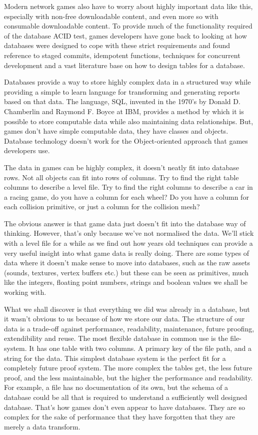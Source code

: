 Modern network games also have to worry about highly important data like this,
especially with non-free downloadable content, and even more so with consumable
downloadable content. To provide much of the functionality required of the
database ACID test, games developers have gone back to looking at how databases
were designed to cope with these strict requirements and found reference to
staged commits, idempotent functions, techniques for concurrent development and
a vast literature base on how to design tables for a database.

Databases provide a way to store highly complex data in a structured way while
providing a simple to learn language for transforming and generating reports
based on that data. The language, SQL, invented in the 1970's by Donald D.
Chamberlin and Raymond F. Boyce at IBM, provides a method by which it is
possible to store computable data while also maintaining data relationships.
But, games don't have simple computable data, they have classes and objects.
Database technology doesn't work for the Object-oriented approach that games
developers use.

The data in games can be highly complex, it doesn't neatly fit into database
rows. Not all objects can fit into rows of columns. Try to find the right table
columns to describe a level file. Try to find the right columns to describe a
car in a racing game, do you have a column for each wheel? Do you have a column
for each collision primitive, or just a column for the collision mesh?

The obvious answer is that game data just doesn't fit into the database way of
thinking. However, that's only because we've not normalised the data. We'll
stick with a level file for a while as we find out how years old techniques can
provide a very useful insight into what game data is really doing. There are
some types of data where it doesn't make sense to move into databases, such as
the raw assets (sounds, textures, vertex buffers etc.) but these can be seen as
primitives, much like the integers, floating point numbers, strings and boolean
values we shall be working with.

What we shall discover is that everything we did was already in a database, but
it wasn't obvious to us because of how we store our data. The structure of our
data is a trade-off against performance, readability, maintenance, future
proofing, extendibility and reuse. The most flexible database in common use is
the file-system. It has one table with two columns. A primary key of the file
path, and a string for the data. This simplest database system is the perfect
fit for a completely future proof system. The more complex the tables get, the
less future proof, and the less maintainable, but the higher the performance
and readability. For example, a file has no documentation of its own, but the
schema of a database could be all that is required to understand a sufficiently
well designed database. That's how games don't even appear to have databases.
They are so complex for the sake of performance that they have forgotten that
they are merely a data transform.


